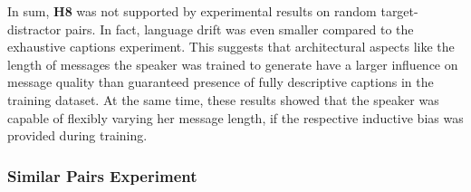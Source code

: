 In sum, \textbf{H8} was not supported by experimental results on random target-distractor pairs. In fact, language drift was even smaller compared to the exhaustive captions experiment. This suggests that architectural aspects like the length of messages the speaker was trained to generate have a larger influence on message quality than guaranteed presence of fully descriptive captions in the training dataset. At the same time, these results showed that the speaker was capable of flexibly varying her message length, if the respective inductive bias was provided during training. 

\subsubsection{Similar Pairs Experiment}
\label{expt:3d_similar}

